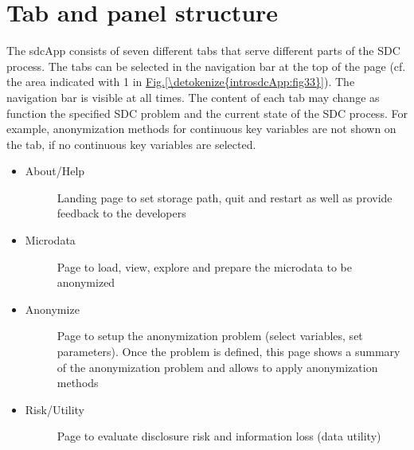 \documentclass[letterpaper,10pt,english]{sphinxmanual}
\begin{document}
\section{Tab and panel structure}
\label{\detokenize{introsdcApp:tab-and-panel-structure}}
The sdcApp consists of seven different tabs that serve different parts of the
SDC process. The tabs can be selected in the navigation
bar at the top of the page (cf. the area indicated with 1 in \hyperref[\detokenize{introsdcApp:fig33}]{Fig.\@ \ref{\detokenize{introsdcApp:fig33}}}).
The navigation bar is visible at all times. The content of each tab may change as
function the specified SDC problem and the current state of the SDC process. For example,
anonymization methods for continuous key variables are not shown on the  tab,
if no continuous key variables are selected.
\begin{itemize}
\item {} \begin{description}
\item[{About/Help}] \leavevmode
Landing page to set storage path, quit and restart  as well as provide feedback to the developers

\end{description}

\item {} \begin{description}
\item[{Microdata}] \leavevmode
Page to load, view, explore and prepare the microdata to be anonymized

\end{description}

\item {} \begin{description}
\item[{Anonymize}] \leavevmode
Page to setup the anonymization problem (select variables, set parameters). Once the
problem is defined, this page shows a summary of the anonymization problem and allows
to apply anonymization methods

\end{description}

\item {} \begin{description}
\item[{Risk/Utility}] \leavevmode
Page to evaluate disclosure risk and information loss (data utility)

\end{description}


\end{itemize}
\end{document}
